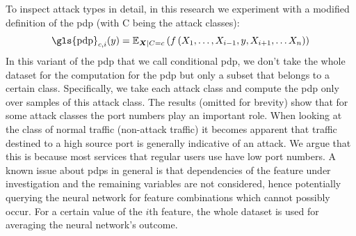 \documentclass[conference]{IEEEtran}
\newcommand\note[2]{{\color{#1}#2}}
\newcommand\todo[1]{{\note{red}{TODO: #1}}}
\begin{document}
To inspect attack types in detail, in this research we experiment with a modified definition of the \gls{pdp}  (with C being the attack classes):
\begin{equation} \label{eq:pdp_conditional}
\text{\gls{pdp}}_{c,i}(y) = \mathbb E_{\boldsymbol X | C = c} \left(f \left( X_1,\ldots,X_{i-1},y,X_{i+1},\ldots X_n \right) \right)
\end{equation}
%
%
%
In this variant of the \gls{pdp} that we call conditional \gls{pdp}, we don't take the whole dataset for the computation for the \gls{pdp} but only a subset that belongs to a certain class. Specifically, we take each attack class and compute the \gls{pdp} only over samples of this attack class. The results (omitted for brevity) show that for some attack classes the port numbers play an important role. When looking at the class of normal traffic (non-attack traffic) it becomes apparent that traffic destined to a high source port is generally indicative of an attack. We argue that this is because most services that regular users use have low port numbers. A known issue about \glspl{pdp} in general is that dependencies of the feature under investigation and the remaining variables are not considered, hence potentially querying the neural network for feature combinations which cannot possibly occur. For a certain value of the $i$th feature, the whole dataset is used for averaging the neural network's outcome. 

\end{document}
